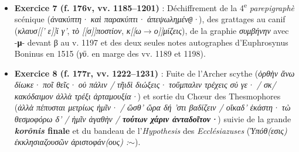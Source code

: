 \documentclass[11pt,a4paper]{article}
\begin{document}
\begin{itemize}
    \item \textbf{Exercice 7 (f. 176v, vv. 1185--1201)} : Déchiffrement de la 4\textsuperscript{e} \textit{parepigraphè} scénique (\textit{ἀνακύπτη· καὶ παρακύπτι· ἀπεψωλημέν\texttt{@}·}), des grattages au canif (\textit{κλαυσ[[' ε]]ϊ γ'}, \textit{τὸ [[σ]]ποστίον}, \textit{κ[[ω$\rightarrow$ο]]μίζεις}), de la graphie \textit{συμβήνην} avec -\textbf{μ}- devant β au v. 1197 et des deux seules notes autographes d'Euphrosynus Boninus en 1515 (\textit{γϋ.} en marge des vv. 1189 et 1198).
    \item \textbf{Exercice 8 (f. 177r, vv. 1222--1231)} : Fuite de l'Archer scythe (\textit{ὀρθὴν ἄνω δίωκε· ποῖ θεῖς· οὐ πάλιν / τῆιδὶ διώξεις· τοὔμπαλιν τρέχεις σύ γε· / σκ/ κακόδαιμον ἀλλὰ τρέξι ἀρταμουξία·}) et sortie du Chœur des Thesmophores (\textit{ἀλλὰ πέπυσται μετρίως ἡμῖν· / ὥσθ' ὥρα δή 'στι βαδίζειν / οἴκαδ' ἑκάστη· τὼ θεσμοφόρω δ' / ἡμῖν ἀγαθὴν / \textbf{τούτων χάριν ἀνταδοῖτον·}}) suivie de la grande \textbf{\textit{korônis} finale} et du bandeau de l'\textit{Hypothesis} des \textit{Ecclésiazuses} (\textit{Ὑπόθ(εσις) ἐκκλησιαζουσῶν ἀριστοφάν(ους) :$\sim$}).
\end{itemize}
\end{document}

